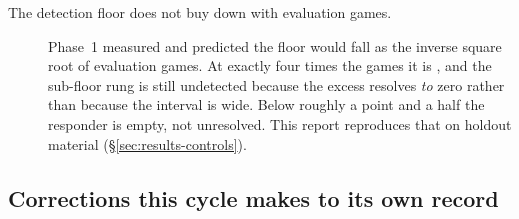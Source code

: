 \begin{description}
\item[The detection floor does not buy down with evaluation games.] Phase~1 measured
  \vsevenFloorPhaseOne{} and predicted the floor would fall as the inverse square root of evaluation
  games. At exactly four times the games it is \vsevenPrimaryFloor{}, and the sub-floor rung is still
  undetected because the excess resolves \emph{to} zero rather than because the interval is wide. Below
  roughly a point and a half the responder is empty, not unresolved. This report reproduces that on
  holdout material (\S\ref{sec:results-controls}).

\end{description}

\subsection{Corrections this cycle makes to its own record}
\label{sec:corrections-self}

